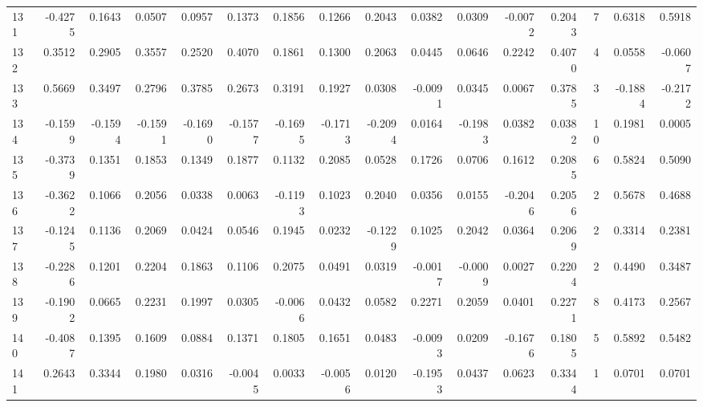 \begin{tabular}{lrrrrrrrrrrrrrrr}
131 &     -0.4275 &  0.1643 &  0.0507 &  0.0957 &  0.1373 &  0.1856 &  0.1266 &  0.2043 &  0.0382 &  0.0309 &  -0.0072 &     0.2043 &      7 &                    0.6318 &                     0.5918 \\
132 &      0.3512 &  0.2905 &  0.3557 &  0.2520 &  0.4070 &  0.1861 &  0.1300 &  0.2063 &  0.0445 &  0.0646 &   0.2242 &     0.4070 &      4 &                    0.0558 &                    -0.0607 \\
133 &      0.5669 &  0.3497 &  0.2796 &  0.3785 &  0.2673 &  0.3191 &  0.1927 &  0.0308 & -0.0091 &  0.0345 &   0.0067 &     0.3785 &      3 &                   -0.1884 &                    -0.2172 \\
134 &     -0.1599 & -0.1594 & -0.1591 & -0.1690 & -0.1577 & -0.1695 & -0.1713 & -0.2094 &  0.0164 & -0.1983 &   0.0382 &     0.0382 &     10 &                    0.1981 &                     0.0005 \\
135 &     -0.3739 &  0.1351 &  0.1853 &  0.1349 &  0.1877 &  0.1132 &  0.2085 &  0.0528 &  0.1726 &  0.0706 &   0.1612 &     0.2085 &      6 &                    0.5824 &                     0.5090 \\
136 &     -0.3622 &  0.1066 &  0.2056 &  0.0338 &  0.0063 & -0.1193 &  0.1023 &  0.2040 &  0.0356 &  0.0155 &  -0.2046 &     0.2056 &      2 &                    0.5678 &                     0.4688 \\
137 &     -0.1245 &  0.1136 &  0.2069 &  0.0424 &  0.0546 &  0.1945 &  0.0232 & -0.1229 &  0.1025 &  0.2042 &   0.0364 &     0.2069 &      2 &                    0.3314 &                     0.2381 \\
138 &     -0.2286 &  0.1201 &  0.2204 &  0.1863 &  0.1106 &  0.2075 &  0.0491 &  0.0319 & -0.0017 & -0.0009 &   0.0027 &     0.2204 &      2 &                    0.4490 &                     0.3487 \\
139 &     -0.1902 &  0.0665 &  0.2231 &  0.1997 &  0.0305 & -0.0066 &  0.0432 &  0.0582 &  0.2271 &  0.2059 &   0.0401 &     0.2271 &      8 &                    0.4173 &                     0.2567 \\
140 &     -0.4087 &  0.1395 &  0.1609 &  0.0884 &  0.1371 &  0.1805 &  0.1651 &  0.0483 & -0.0093 &  0.0209 &  -0.1676 &     0.1805 &      5 &                    0.5892 &                     0.5482 \\
141 &      0.2643 &  0.3344 &  0.1980 &  0.0316 & -0.0045 &  0.0033 & -0.0056 &  0.0120 & -0.1953 &  0.0437 &   0.0623 &     0.3344 &      1 &                    0.0701 &                     0.0701 \\

\end{tabular}
